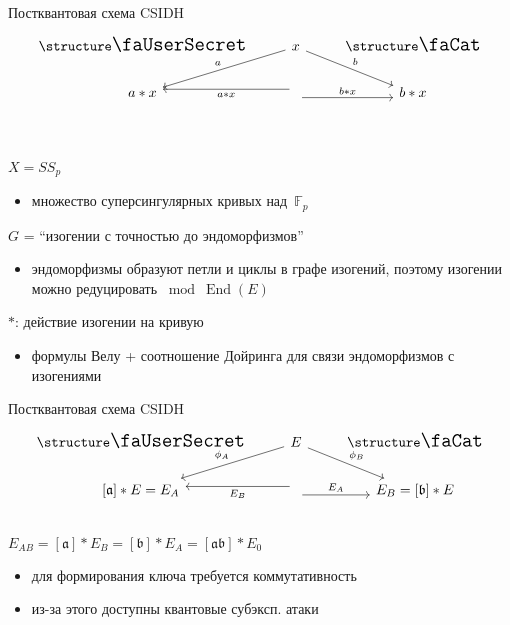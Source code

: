 \documentclass{beamer}
\begin{document}
\begin{frame}[fragile]{Постквантовая схема CSIDH}
	\[
	\begin{tikzcd}
		\text{\UserA} &\arrow{ld}[swap]{a} x  \arrow{rd}{b} & \text{\UserB} \\
		a * x &
		\arrow[yshift=-0.7ex]{r}{b * x}
		\arrow[yshift=0.7ex]{l}{a * x}
		& b * x\\
	\end{tikzcd}
	\]
	\vspace{-1.5em}

	\\
	\vspace{0.2em}
	$X = SS_p$
	\begin{itemize}
		\item 
		множество суперсингулярных кривых над~$\mathbb{F}_p$
	\end{itemize}
	$G$ = ``изогении с точностью до эндоморфизмов''
	\begin{itemize}
		\item эндоморфизмы образуют петли и циклы в графе изогений, поэтому изогении можно редуцировать $\bmod \operatorname{End}(E)$
	\end{itemize}	
	
	$*$: действие изогении на кривую
	\begin{itemize}
		\item формулы Велу + соотношение Дойринга для связи эндоморфизмов с изогениями
	\end{itemize}
\end{frame}

\begin{frame}[fragile]{Постквантовая схема CSIDH}
	\[
	\begin{tikzcd}
		\text{\UserA} &\arrow{ld}[swap]{\phi_{A}} E  \arrow{rd}{\phi_{B}} & \text{\UserB} \\
		\left[\mathfrak{a}\right] * E  = E_A&
		\arrow[yshift=-0.7ex]{r}{E_A}
		\arrow[yshift=0.7ex]{l}{E_B}
		& E_B = \left[\mathfrak{b}\right] * E\\
	\end{tikzcd}
	\]
	\vspace{-0.5em}
	 $E_{AB} = [\mathfrak{a}] * E_B = [\mathfrak{b}] * E_A = [\mathfrak{a}\mathfrak{b}] * E_0$
	\vspace{0.5em}
	\begin{itemize}
		\item для формирования ключа требуется коммутативность
		\item из-за этого доступны квантовые субэксп. атаки
	\end{itemize}
\end{frame}
\end{document}
